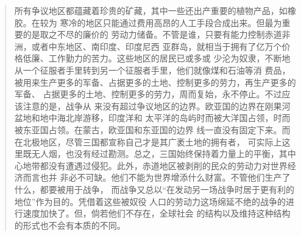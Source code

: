 \begin{paracol}{2}
\begin{quotation}
所有争议地区都蕴藏着珍贵的矿藏，其中一些还出产重要的植物产品，如橡胶。在较为
寒冷的地区只能通过费用高昂的人工手段合成出来。但最为重要的是取之不尽的廉价的
劳动力储备。不管是谁，只要有能力控制赤道非洲，或者中东地区、南印度、印度尼西
亚群岛，就相当于拥有了亿万个价格低廉、工作勤力的苦力。这些地区的居民已或多或
少沦为奴隶，不断地从一个征服者手里转到另一个征服者手里，他们就像煤和石油等消
费品，被用来生产更多的军备、占据更多的土地、控制更多的劳力，再生产更多的军备、
占据更多的土地、控制更多的劳力，周而复始，永不停止。不过应该注意的是，战争从
来没有超过争议地区的边界。欧亚国的边界在刚果河盆地和地中海北岸游移，印度洋和
太平洋的岛屿时而被大洋国占领，时而被东亚国占领。在蒙古，欧亚国和东亚国的边界
线一直没有固定下来。而在北极地区，尽管三国都宣称自己才是其广袤土地的拥有者，
可实际上这里既无人烟，也没有经过勘测。总之，三国始终保持着力量上的平衡，其中
心地带都没有遭遇过侵犯。此外，赤道地区被剥削的民众的劳动力对世界经济而言也并
非必不可缺。他们不能为世界增添什么财富。不管他们生产了什么，都要被用于战争，
而战争又总以``在发动另一场战争时居于更有利的地位''作为目的。凭借着这些被奴役
人口的劳动力这场绵延不绝的战争的进行速度加快了。但，倘若他们不存在，全球社会
的结构以及维持这种结构的形式也不会有本质的不同。
\end{quotation}

\switchcolumn*


\end{paracol}
